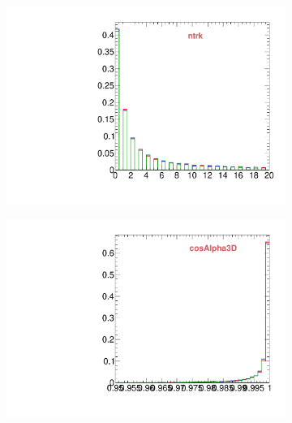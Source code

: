 \begin{figure}
        \centering
        \begin{subfigure}[b]{0.2\textwidth}
                \centering
                \includegraphics[width=\textwidth]{Figures/VariablesComparison/MC_barrel_figs_3h/ntrk}
                \label{fig:MC_barrel_ntrk_3h}
        \end{subfigure}
        \begin{subfigure}[b]{0.2\textwidth}
                \centering
                \includegraphics[width=\textwidth]{Figures/VariablesComparison/MC_barrel_figs_3h/cosAlpha3D}
                \label{fig:MC_barrel_cosAlpha3D_3h}
        \end{subfigure}
        \begin{subfigure}[b]{0.2\textwidth}
                \centering

\end{subfigure}
\end{figure}
